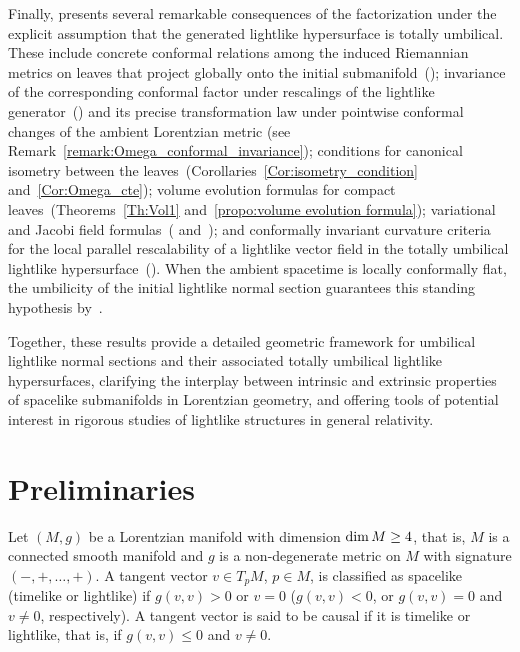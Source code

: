 \documentclass[11pt]{article}
\numberwithin{equation}{section}
\begin{document}
Finally,  presents several remarkable consequences of the factorization under the explicit assumption that the generated lightlike hypersurface is totally umbilical. These include concrete conformal relations among the induced Riemannian metrics on leaves that project globally onto the initial submanifold~(); invariance of the corresponding conformal factor under rescalings of the lightlike generator~() and its precise transformation law under pointwise conformal changes of the ambient Lorentzian metric (see Remark~\ref{remark:Omega_conformal_invariance}); conditions for canonical isometry between the leaves~(Corollaries~\ref{Cor:isometry_condition} and~\ref{Cor:Omega_cte}); volume evolution formulas for compact leaves~(Theorems~\ref{Th:Vol1} and~\ref{propo:volume evolution formula}); variational and Jacobi field formulas~( and~); and conformally invariant curvature criteria for the local parallel rescalability of a lightlike vector field in the totally umbilical lightlike hypersurface~(). When the ambient spacetime is locally conformally flat, the umbilicity of the initial lightlike normal section guarantees this standing hypothesis by~.

Together, these results provide a detailed geometric framework for umbilical lightlike normal sections and their associated totally umbilical lightlike hypersurfaces, clarifying the interplay between intrinsic and extrinsic properties of spacelike submanifolds in Lorentzian geometry, and offering tools of potential interest in rigorous studies of lightlike structures in general relativity.

	\section{Preliminaries}\label{sec:prelim}
	
	Let $(M,g)$ be a Lorentzian manifold with dimension ${\rm dim}\, M \geq 4$, that is,  $M$ is a connected smooth manifold and $g$ is a non-degenerate metric on $M$ with signature $(-,+,\ldots,+)$.  A tangent vector
	$v\in T_pM$, $p\in M$, is classified as spacelike (timelike or lightlike) if
		$g(v,v)>0$ or $v=0$ ($g(v,v)<0$, or $g(v,v)=0$ and $v\neq0$,
		respectively). A tangent vector is said to be causal if it is timelike or lightlike, that is, if $g(v,v)\leq 0$ and $v\neq 0.$ 
	
	
	
\end{document}
